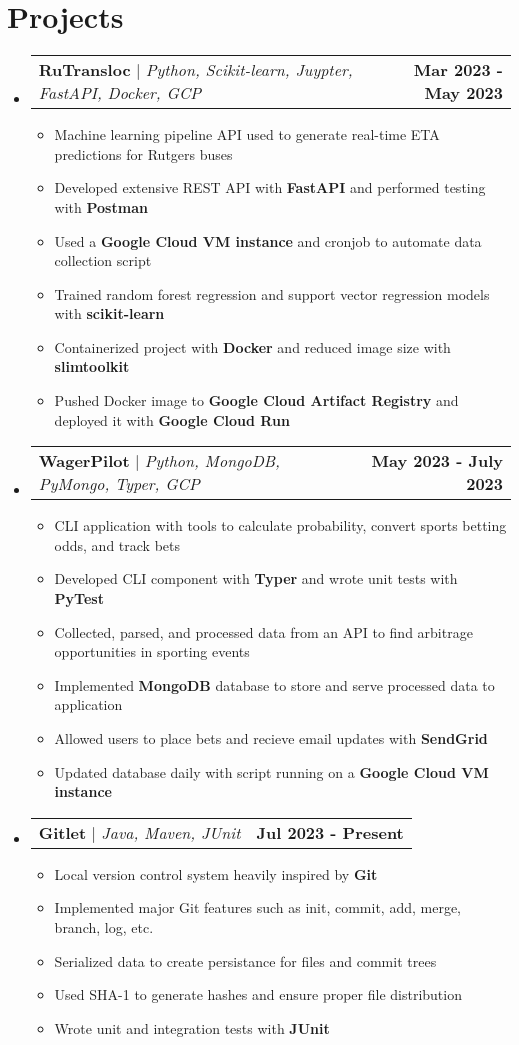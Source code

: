 \documentclass[letterpaper,11pt]{article}
\makeatletter
\newcommand{\resumeItem}[1]{
  \item\small{
    {#1 \vspace{-2pt}}
  }
}
\newcommand{\resumeProjectHeading}[2]{
    \item
    \begin{tabular*}{0.97\textwidth}{l@{\extracolsep{\fill}}r}
      \small#1 & #2 \\
    \end{tabular*}\vspace{-7pt}
}
\newcommand{\resumeSubHeadingListStart}{\begin{itemize}[leftmargin=0.15in, label={}]}
\newcommand{\resumeSubHeadingListEnd}{\end{itemize}}
\newcommand{\resumeItemListStart}{\begin{itemize}}
\newcommand{\resumeItemListEnd}{\end{itemize}\vspace{-3pt}}
\makeatother
\begin{document}
\section{Projects}
    \resumeSubHeadingListStart
      \resumeProjectHeading
          {\textbf{RuTransloc} $|$ \emph{Python, Scikit-learn, Juypter, FastAPI, Docker, GCP}}{\textbf{Mar 2023 - May 2023}}
          \resumeItemListStart
            \resumeItem{Machine learning pipeline API used to generate real-time ETA predictions for Rutgers buses}
            \resumeItem{Developed extensive REST API with \textbf{FastAPI} and performed testing with \textbf{Postman}}
            \resumeItem{Used a \textbf{Google Cloud VM instance} and cronjob to automate data collection script}
            \resumeItem{Trained random forest regression and support vector regression models with \textbf{scikit-learn}}
            \resumeItem{Containerized project with \textbf{Docker} and reduced image size with \textbf{slimtoolkit}}
            \resumeItem{Pushed Docker image to \textbf{Google Cloud Artifact Registry} and deployed it with \textbf{Google Cloud Run}}
          \resumeItemListEnd
      \resumeProjectHeading
          {\textbf{WagerPilot} $|$ \emph{Python, MongoDB, PyMongo, Typer, GCP}}{\textbf{May 2023 - July 2023}}
          \resumeItemListStart
            \resumeItem{CLI application with tools to calculate probability, convert sports betting odds, and track bets}
            \resumeItem{Developed CLI component with \textbf{Typer} and wrote unit tests with \textbf{PyTest}}
            \resumeItem{Collected, parsed, and processed data from an API to find arbitrage opportunities in sporting events}
            \resumeItem{Implemented \textbf{MongoDB} database to store and serve processed data to application}
            \resumeItem{Allowed users to place bets and recieve email updates with \textbf{SendGrid}}
            \resumeItem{Updated database daily with script running on a \textbf{Google Cloud VM instance}}
          \resumeItemListEnd
      \resumeProjectHeading
          {\textbf{Gitlet} $|$ \emph{Java, Maven, JUnit}}{\textbf{Jul 2023 - Present}}
          \resumeItemListStart
            \resumeItem{Local version control system heavily inspired by \textbf{Git}}
            \resumeItem{Implemented major Git features such as init, commit, add, merge, branch, log, etc.}
            \resumeItem{Serialized data to create persistance for files and commit trees}
            \resumeItem{Used SHA-1 to generate hashes and ensure proper file distribution}
            \resumeItem{Wrote unit and integration tests with \textbf{JUnit}}
          \resumeItemListEnd
    \resumeSubHeadingListEnd
\end{document}

